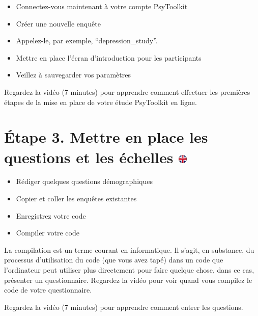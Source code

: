 \documentclass[
]{book}
\providecommand{\tightlist}{%
  \setlength{\itemsep}{0pt}\setlength{\parskip}{0pt}}
\begin{document}
\begin{itemize}
\tightlist
\item
  Connectez-vous maintenant à votre compte PsyToolkit
\item
  Créer une nouvelle enquête
\item
  Appelez-le, par exemple, ``depression\_study''.
\item
  Mettre en place l'écran d'introduction pour les participants
\item
  Veillez à sauvegarder vos paramètres
\end{itemize}

Regardez la vidéo (7 minutes) pour apprendre comment effectuer les
premières étapes de la mise en place de votre étude PsyToolkit en ligne.

\hypertarget{uxe9tape-3.-mettre-en-place-les-questions-et-les-uxe9chelles}{%
\section[Étape 3. Mettre en place les questions et les échelles
]{\texorpdfstring{Étape 3. Mettre en place les questions et les échelles
\href{https://www.psytoolkit.org/lessons/questionnaire-project.html\#_step_3_setup_questions_and_scales}{\protect\includegraphics{img/ukflag.png}}}{Étape 3. Mettre en place les questions et les échelles }}\label{uxe9tape-3.-mettre-en-place-les-questions-et-les-uxe9chelles}}

\begin{itemize}
\tightlist
\item
  Rédiger quelques questions démographiques
\item
  Copier et coller les enquêtes existantes
\item
  Enregistrez votre code
\item
  Compiler votre code
\end{itemize}

La compilation est un terme courant en informatique. Il s'agit, en
substance, du processus d'utilisation du code (que vous avez tapé) dans
un code que l'ordinateur peut utiliser plus directement pour faire
quelque chose, dans ce cas, présenter un questionnaire. Regardez la
vidéo pour voir quand vous compilez le code de votre questionnaire.

Regardez la vidéo (7 minutes) pour apprendre comment entrer les
questions.
\end{document}
